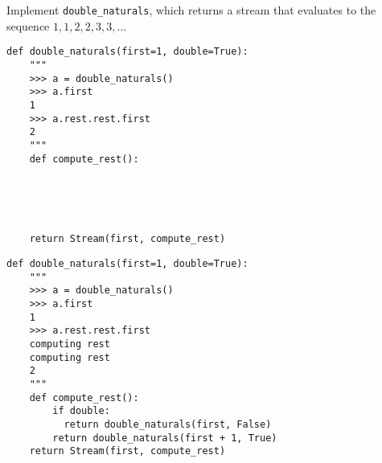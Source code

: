 \begin{blocksection}
\question Implement \lstinline$double_naturals$, which returns a stream that evaluates to
the sequence $1, 1, 2, 2, 3, 3, \ldots$

\ifprintanswers\else
\begin{lstlisting}
def double_naturals(first=1, double=True):
    """
    >>> a = double_naturals()
    >>> a.first
    1
    >>> a.rest.rest.first
    2
    """
    def compute_rest():





    return Stream(first, compute_rest)
\end{lstlisting}
\fi

\begin{solution}
\begin{lstlisting}
def double_naturals(first=1, double=True):
    """
    >>> a = double_naturals()
    >>> a.first
    1
    >>> a.rest.rest.first
    computing rest
    computing rest
    2
    """
    def compute_rest():
        if double:
          return double_naturals(first, False)
        return double_naturals(first + 1, True)
    return Stream(first, compute_rest)
\end{lstlisting}
\end{solution}
\end{blocksection}
